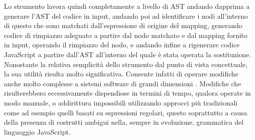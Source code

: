 Lo strumento lavora quindi completamente a livello di AST andando dapprima a
generare l’AST del codice in input, andando poi ad identificare i nodi
all’interno di questo che sono matchati dall’espressione di origine del mapping,
generando codice di rimpiazzo adeguato a partire dal nodo matchato e dal mapping
fornito in input, operando il rimpiazzo del nodo, e andando infine a rigenerare
codice JavaScript a partire dall’AST all’interno del quale è stata operata la
sostituzione.\\

Nonostante la relativa semplicità dello strumento dal punto di vista
concettuale, la sua utilità risulta molto significativa. Consente infatti di
operare modifiche anche molto complesse a sistemi software di grandi dimensioni
\cite{jsconf2016}. Modifiche che risulterebbero eccessivamente dispendiose in
termini di tempo, qualora operate in modo manuale, o addirittura impossibili
utilizzando approcci più tradizionali come ad esempio quelli basati su
espressioni regolari, questo soprattutto a causa della presenza di costrutti
ambigui nella, sempre in evoluzione, grammatica del linguaggio JavaScript.\\
